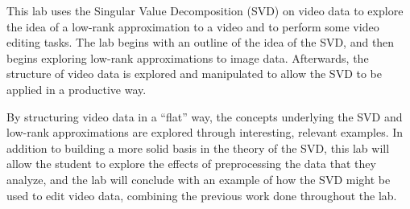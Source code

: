 This lab uses the Singular Value Decomposition (SVD) on video data to explore the idea of a low-rank approximation to a video and to perform some video editing tasks. The lab begins with an outline of the idea of the SVD, and then begins exploring low-rank approximations to image data. Afterwards, the structure of video data is explored and manipulated to allow the SVD to be applied in a productive way.

By structuring video data in a ``flat'' way, the concepts underlying the SVD and low-rank approximations are explored through interesting, relevant examples. In addition to building a more solid basis in the theory of the SVD, this lab will allow the student to explore the effects of preprocessing the data that they analyze, and the lab will conclude with an example of how the SVD might be used to edit video data, combining the previous work done throughout the lab.